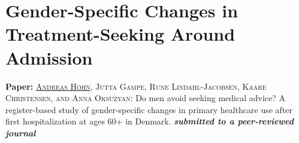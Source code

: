 

\chapter{Gender-Specific Changes in Treatment-Seeking Around Admission}
\label{ch:paper2}




\vspace{0.5in}

\textbf{Paper:}
\textsc{\underline{Andreas H\"ohn}, Jutta Gampe, Rune Lindahl-Jacobsen, 
	    Kaare Christensen, and Anna Oksuzyan:} 
		Do men avoid seeking medical advice? A register-based study of 
		gender-specific changes in primary healthcare use after first 
		hospitalization at ages 60+ in Denmark. \textbf{\textit{submitted 
		to a peer-reviewed journal}}





\newpage


